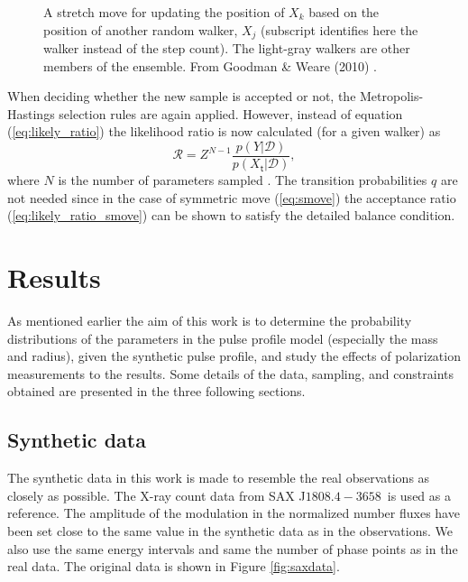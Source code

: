 \documentclass{wihuri}
\def\be{\begin{equation}}
\def\ee{\end{equation}}
\def\source{SAX J$1808.4-3658$}
\def\tstep{\mathsf{t}}
\def\lratio{\mathcal{R}}
\begin{document}
\begin{figure}
\centerline{}
\caption{A stretch move for updating the position of $X_{k}$ based on the position of another random walker, $X_{j}$ (subscript identifies here the walker instead of the step count). The light-gray walkers are other members of the ensemble. From Goodman \& Weare (2010) \cite{ensemble1}.
\label{fig:smove}}
\end{figure}


When deciding whether the new sample is accepted or not, the Metropolis-Hastings selection rules are again applied. However, instead of equation (\ref{eq:likely_ratio}) the likelihood ratio is now calculated (for a given walker) as
\be \label{eq:likely_ratio_smove} 
\lratio = Z^{N-1}\frac{p(Y|\mathcal{D})}{p(X_{\tstep}|\mathcal{D})},
\ee
where $N$ is the number of parameters sampled \cite{emceehammer}. The transition probabilities $q$ are not needed since in the case of symmetric move (\ref{eq:smove}) the acceptance ratio (\ref{eq:likely_ratio_smove}) can be shown to satisfy the detailed balance condition. 




\clearpage

\section{Results}

As mentioned earlier the aim of this work is to determine the probability distributions of the parameters in the pulse profile model (especially the mass and radius), given the synthetic pulse profile, and study the effects of polarization measurements to the results. Some details of the data, sampling, and constraints obtained are presented in the three following sections. 


\subsection{Synthetic data}

The synthetic data in this work is made to resemble the real observations as closely as possible. The X-ray count data from \source \ is used as a reference. The amplitude of the modulation in the normalized number fluxes have been set close to the same value in the synthetic data as in the observations. We also use the same energy intervals and same the number of phase points as in the real data. The original data is shown in Figure \ref{fig:saxdata}.  
\end{document}
